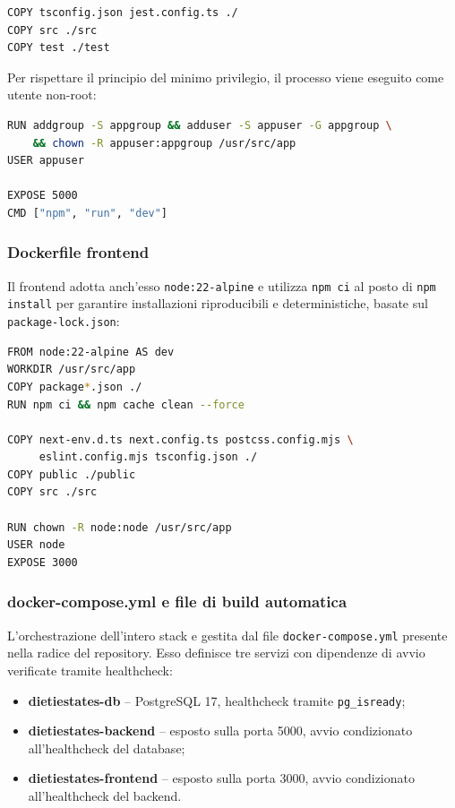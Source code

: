\documentclass[a4paper,11pt]{article}
\begin{document}
\begin{lstlisting}[style=projectcode, language=bash]
COPY tsconfig.json jest.config.ts ./
COPY src ./src
COPY test ./test
\end{lstlisting}

Per rispettare il principio del minimo privilegio, il processo viene eseguito come utente non-root:

\begin{lstlisting}[style=projectcode, language=bash]
RUN addgroup -S appgroup && adduser -S appuser -G appgroup \
    && chown -R appuser:appgroup /usr/src/app
USER appuser

EXPOSE 5000
CMD ["npm", "run", "dev"]
\end{lstlisting}

\subsubsection{Dockerfile frontend}

Il frontend adotta anch'esso \texttt{node:22-alpine} e utilizza \texttt{npm ci} al posto di \texttt{npm install} per garantire installazioni riproducibili e deterministiche, basate sul \texttt{package-lock.json}:

\begin{lstlisting}[style=projectcode, language=bash]
FROM node:22-alpine AS dev
WORKDIR /usr/src/app
COPY package*.json ./
RUN npm ci && npm cache clean --force

COPY next-env.d.ts next.config.ts postcss.config.mjs \
     eslint.config.mjs tsconfig.json ./
COPY public ./public
COPY src ./src

RUN chown -R node:node /usr/src/app
USER node
EXPOSE 3000
\end{lstlisting}

\subsubsection{docker-compose.yml e file di build automatica}

L'orchestrazione dell'intero stack e gestita dal file \texttt{docker-compose.yml} presente nella radice del repository. Esso definisce tre servizi con dipendenze di avvio verificate tramite healthcheck:
\begin{itemize}
  \item \textbf{dietiestates-db} -- PostgreSQL 17, healthcheck tramite \texttt{pg\_isready};
  \item \textbf{dietiestates-backend} -- esposto sulla porta 5000, avvio condizionato all'healthcheck del database;
  \item \textbf{dietiestates-frontend} -- esposto sulla porta 3000, avvio condizionato all'healthcheck del backend.
\end{itemize}
\end{document}
